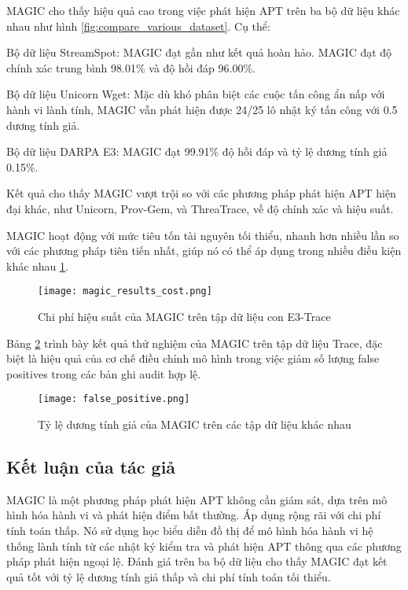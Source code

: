 MAGIC cho thấy hiệu quả cao trong việc phát hiện APT trên ba bộ dữ liệu khác nhau như hình \ref{fig:compare_various_dataset}. Cụ thể:

Bộ dữ liệu StreamSpot: MAGIC đạt gần như kết quả hoàn hảo. MAGIC đạt độ chính xác trung bình 98.01\% và độ hồi đáp 96.00\%.


Bộ dữ liệu Unicorn Wget: Mặc dù khó phân biệt các cuộc tấn công ẩn nấp với hành vi lành tính, MAGIC vẫn phát hiện được 24/25 lô nhật ký tấn công với 0.5 dương tính giả.

Bộ dữ liệu DARPA E3: MAGIC đạt 99.91\% độ hồi đáp và tỷ lệ dương tính giả 0.15\%. 

Kết quả cho thấy MAGIC vượt trội so với các phương pháp phát hiện APT hiện đại khác, như Unicorn, Prov-Gem, và ThreaTrace, về độ chính xác và hiệu suất.

MAGIC hoạt động với mức tiêu tốn tài nguyên tối thiểu, nhanh hơn nhiều lần so với các phương pháp tiên tiến nhất, giúp nó có thể áp dụng trong nhiều điều kiện khác nhau \ref{fig:magic_results_cost}.
\begin{figure}
    \centering
    \texttt{[image: magic\_results\_cost.png]}
    \caption{Chi phí hiệu suất của MAGIC trên tập dữ liệu con E3-Trace}
    \label{fig:magic_results_cost}
\end{figure}

Bảng \ref{fig:false_positive} trình bày kết quả thử nghiệm của MAGIC trên tập dữ liệu Trace, đặc biệt là hiệu quả của cơ chế điều chỉnh mô hình trong việc giảm số lượng false positives trong các bản ghi audit hợp lệ.

\begin{figure}
    \centering
    \texttt{[image: false\_positive.png]}
    \caption{Tỷ lệ dương tính giả của MAGIC trên các tập dữ liệu khác nhau}
    \label{fig:false_positive}
\end{figure}
\subsection{Kết luận của tác giả}

MAGIC là một phương pháp phát hiện APT không cần giám sát, dựa trên mô hình hóa hành vi và phát hiện điểm bất thường. Áp dụng rộng rãi với chi phí tính toán thấp. Nó sử dụng học biểu diễn đồ thị để mô hình hóa hành vi hệ thống lành tính từ các nhật ký kiểm tra và phát hiện APT thông qua các phương pháp phát hiện ngoại lệ. Đánh giá trên ba bộ dữ liệu cho thấy MAGIC đạt kết quả tốt với tỷ lệ dương tính giả thấp và chi phí tính toán tối thiểu.